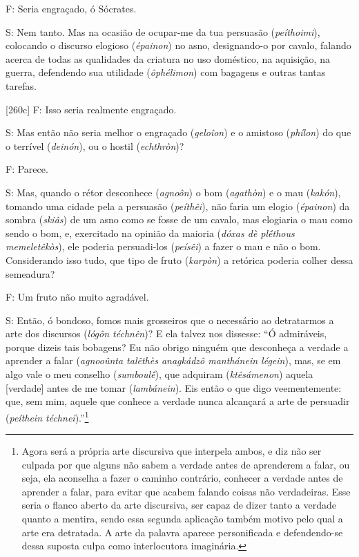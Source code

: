 F: Seria engraçado, ó Sócrates.

S: Nem tanto. Mas na ocasião de ocupar-me da tua persuasão
(\emph{peíthoimi}), colocando o discurso elogioso (\emph{épainon}) no
asno, designando-o por cavalo, falando acerca de todas as qualidades da
criatura no uso doméstico, na aquisição, na guerra, defendendo sua
utilidade (\emph{ôphélimon}) com bagagens e outras tantas tarefas.

{[}260c{]} F: Isso seria realmente engraçado.

S: Mas então não seria melhor o engraçado (\emph{geloîon}) e o amistoso
(\emph{phílon}) do que o terrível (\emph{deinón}), ou o hostil
(\emph{echthròn})?

F: Parece.

S: Mas, quando o rétor desconhece (\emph{agnoôn}) o bom (\emph{agathòn})
e o mau (\emph{kakón}), tomando uma cidade pela a persuasão
(\emph{peíthêi}), não faria um elogio (\emph{épainon}) da sombra
(\emph{skiâs}) de um asno como se fosse de um cavalo, mas elogiaria o
mau como sendo o bom, e, exercitado na opinião da maioria (\emph{dóxas
dè plḗthous memeletêkòs}), ele poderia persuadi-los (\emph{peísêi}) a
fazer o mau e não o bom. Considerando isso tudo, que tipo de fruto
(\emph{karpòn}) a retórica poderia colher dessa semeadura?

F: Um fruto não muito agradável.

S: Então, ó bondoso, fomos mais grosseiros que o necessário ao
detratarmos a arte dos discursos (\emph{lógôn téchnên})? E ela talvez
nos dissesse: ``Ó admiráveis, porque dizeis tais bobagens? Eu não obrigo
ninguém que desconheça a verdade a aprender a falar (\emph{agnooûnta
talêthès anagkádzô manthánein légein}), mas, se em algo vale o meu
conselho (\emph{sumboulḗ}), que adquiram (\emph{ktêsámenon}) aquela
{[}verdade{]} antes de me tomar (\emph{lambánein}). Eis então o que digo
veementemente: que, sem mim, aquele que conhece a verdade nunca
alcançará a arte de persuadir (\emph{peíthein téchnei}).''\footnote{Agora
  será a própria arte discursiva que interpela ambos, e diz não ser
  culpada por que alguns não sabem a verdade antes de aprenderem a
  falar, ou seja, ela aconselha a fazer o caminho contrário, conhecer a
  verdade antes de aprender a falar, para evitar que acabem falando
  coisas não verdadeiras. Esse seria o flanco aberto da arte discursiva,
  ser capaz de dizer tanto a verdade quanto a mentira, sendo essa
  segunda aplicação também motivo pelo qual a arte era detratada. A arte
  da palavra aparece personificada e defendendo-se dessa suposta culpa
  como interlocutora imaginária.}

